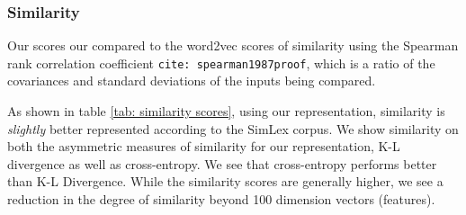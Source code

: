 \documentclass[11pt]{book}
\newcommand{\citep}[1]{\texttt{cite: #1}}
\begin{document}
\subsubsection{Similarity} 

Our scores our compared to the word2vec scores of similarity using the Spearman
rank correlation coefficient \citep{spearman1987proof}, which is a ratio of the
covariances and standard deviations of the inputs being compared. 

% 
As shown in table \ref{tab: similarity scores}, using our representation,
similarity is \textit{slightly} better represented according to the SimLex
corpus. We show similarity on both the asymmetric measures of similarity for
our representation, K-L divergence as well as cross-entropy. We see that
cross-entropy performs better than K-L Divergence. While the similarity scores
are generally higher, we see a reduction in the degree of similarity beyond 100
dimension vectors (features).
\end{document}
